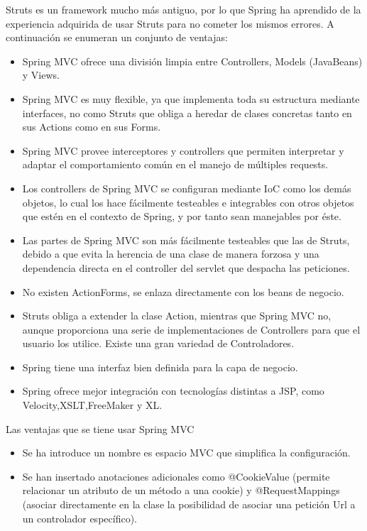 \begin{itemize}
		Struts es un framework mucho más antiguo, por lo que Spring ha aprendido de la experiencia adquirida de usar Struts para no cometer los mismos errores. \cite{introspring}
		A continuación se enumeran un conjunto de ventajas:
		\begin{itemize}
			\item Spring MVC ofrece una división limpia entre Controllers, Models (JavaBeans) y Views. 
			\item Spring MVC es muy flexible, ya que implementa toda su estructura mediante interfaces, no como Struts que obliga a heredar de clases concretas tanto en sus Actions como en sus Forms. 
			\item Spring MVC provee interceptores y controllers que permiten interpretar y adaptar el comportamiento común en el manejo de múltiples requests.
			\item Los controllers de Spring MVC se configuran mediante IoC como los demás objetos, lo cual los hace fácilmente testeables e integrables con otros objetos que estén en el contexto de Spring, y por tanto sean manejables por éste. 
			\item Las partes de Spring MVC son más fácilmente testeables que las de Struts, debido a que evita la herencia de una clase de manera forzosa y una dependencia directa en el controller del servlet que despacha las peticiones. 
			\item No existen ActionForms, se enlaza directamente con los beans de negocio. 
			\item Struts obliga a extender la clase Action, mientras que Spring MVC no, aunque proporciona una serie de implementaciones de Controllers para que el usuario los utilice. Existe una gran variedad de Controladores.
			\item Spring tiene una interfaz bien definida para la capa de negocio. 
			\item Spring ofrece mejor integración con tecnologías distintas a JSP, como Velocity,XSLT,FreeMaker y XL. 
		\end{itemize}
		Las ventajas que se tiene usar Spring MVC 
		\begin{itemize}
			\item Se ha introduce un nombre es espacio MVC que simplifica la configuración.
			\item Se han insertado anotaciones adicionales como @CookieValue (permite relacionar un atributo de un método a una cookie) y @RequestMappings (asociar directamente en la clase la posibilidad de asociar una petición Url a un controlador específico).

\end{itemize}
\end{itemize}
